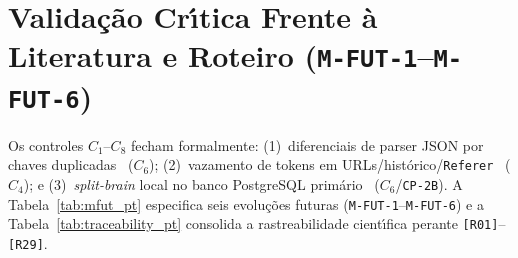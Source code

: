 \documentclass[10pt,twocolumn]{article}
\begin{document}
\section{Valida\c{c}\~{a}o Cr\'{\i}tica Frente \`{a} Literatura e Roteiro (\texttt{M-FUT-1}--\texttt{M-FUT-6})}

Os controles $C_1$--$C_8$ fecham formalmente: (1)~diferenciais de parser JSON por chaves duplicadas~\cite{R11,R12,R17,R19} ($C_6$); (2)~vazamento de tokens em URLs/hist\'{o}rico/\texttt{Referer}~\cite{R28} ($C_4$); e (3)~\emph{split-brain} local no banco PostgreSQL prim\'{a}rio~\cite{R13} ($C_6$/\texttt{CP-2B}). A Tabela~\ref{tab:mfut_pt} especifica seis evolu\c{c}\~{o}es futuras (\texttt{M-FUT-1}--\texttt{M-FUT-6}) e a Tabela~\ref{tab:traceability_pt} consolida a rastreabilidade cient\'{\i}fica perante \texttt{[R01]}--\texttt{[R29]}.
\end{document}
